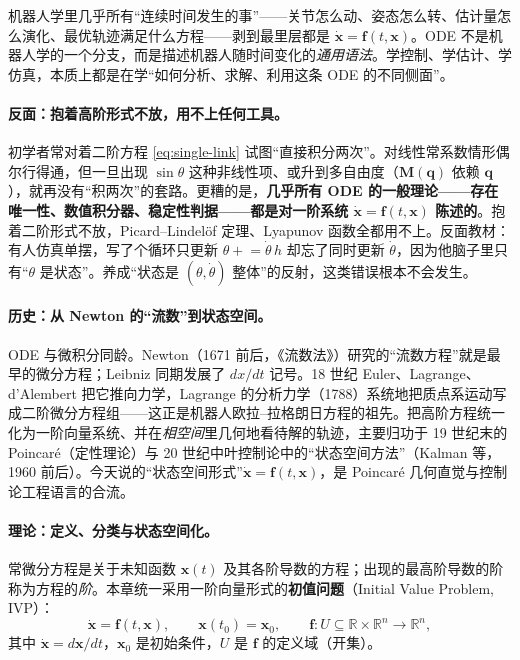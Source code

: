 \begin{insight}
机器人学里几乎所有“连续时间发生的事”——关节怎么动、姿态怎么转、估计量怎么演化、最优轨迹满足什么方程——剥到最里层都是 $\dot{\mathbf{x}}=\mathbf{f}(t,\mathbf{x})$。ODE 不是机器人学的一个分支，而是描述机器人随时间变化的\emph{通用语法}。学控制、学估计、学仿真，本质上都是在学“如何分析、求解、利用这条 ODE 的不同侧面”。
\end{insight}

\paragraph{反面：抱着高阶形式不放，用不上任何工具。}
初学者常对着二阶方程 \cref{eq:single-link} 试图“直接积分两次”。对线性常系数情形偶尔行得通，但一旦出现 $\sin\theta$ 这种非线性项、或升到多自由度（$\mathbf{M}(\mathbf{q})$ 依赖 $\mathbf{q}$），就再没有“积两次”的套路。更糟的是，\textbf{几乎所有 ODE 的一般理论——存在唯一性、数值积分器、稳定性判据——都是对一阶系统 $\dot{\mathbf{x}}=\mathbf{f}(t,\mathbf{x})$ 陈述的}。抱着二阶形式不放，Picard--Lindelöf 定理、Lyapunov 函数全都用不上。反面教材：有人仿真单摆，写了个循环只更新 $\theta\mathrel{+}=\dot\theta\,h$ 却忘了同时更新 $\dot\theta$，因为他脑子里只有“$\theta$ 是状态”。养成“状态是 $(\theta,\dot\theta)$ 整体”的反射，这类错误根本不会发生。

\paragraph{历史：从 Newton 的“流数”到状态空间。}
ODE 与微积分同龄。Newton（1671 前后，《流数法》）研究的“流数方程”就是最早的微分方程；Leibniz 同期发展了 $dx/dt$ 记号。18 世纪 Euler、Lagrange、d'Alembert 把它推向力学，Lagrange 的分析力学（1788）系统地把质点系运动写成二阶微分方程组——这正是机器人欧拉--拉格朗日方程的祖先\cite{arnold1989mathematical}。把高阶方程统一化为一阶向量系统、并在\emph{相空间}里几何地看待解的轨迹，主要归功于 19 世纪末的 Poincaré（定性理论）与 20 世纪中叶控制论中的“状态空间方法”（Kalman 等，1960 前后）。今天说的“状态空间形式”$\dot{\mathbf{x}}=\mathbf{f}(t,\mathbf{x})$，是 Poincaré 几何直觉与控制论工程语言的合流。

\paragraph{理论：定义、分类与状态空间化。}

\begin{definition}[常微分方程与初值问题]\label{def:ode-ivp}
常微分方程是关于未知函数 $\mathbf{x}(t)$ 及其各阶导数的方程；出现的最高阶导数的阶称为方程的\emph{阶}。本章统一采用一阶向量形式的\textbf{初值问题}（Initial Value Problem, IVP）：
\begin{equation}
  \dot{\mathbf{x}}=\mathbf{f}(t,\mathbf{x}),\qquad \mathbf{x}(t_0)=\mathbf{x}_0,\qquad \mathbf{f}:U\subseteq\mathbb{R}\times\mathbb{R}^n\to\mathbb{R}^n,
  \label{eq:ivp}
\end{equation}
其中 $\dot{\mathbf{x}}=d\mathbf{x}/dt$，$\mathbf{x}_0$ 是初始条件，$U$ 是 $\mathbf{f}$ 的定义域（开集）。
\end{definition}

